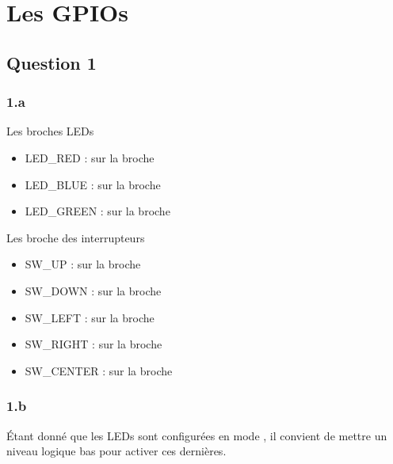 \chapter{Les GPIOs}

 \section{Question 1}

\subsection{1.a}

Les broches LEDs 

\begin{itemize}

  \item LED\_RED :  sur la broche 
  \item LED\_BLUE :  sur la broche 
  \item LED\_GREEN :  sur la broche 

\end{itemize}

Les broche des interrupteurs 

\begin{itemize}

  \item SW\_UP :  sur la broche 
  \item SW\_DOWN :  sur la broche 
  \item SW\_LEFT :  sur la broche 
  \item SW\_RIGHT :  sur la broche 
  \item SW\_CENTER :  sur la broche 

\end{itemize}

\subsection{1.b}

Étant donné que les LEDs sont configurées en mode , 
il convient de mettre un niveau logique bas pour activer ces dernières. \\



